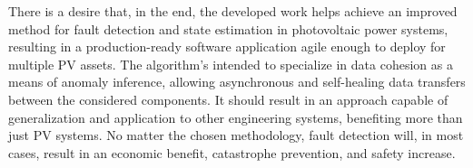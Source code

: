 There is a desire that, in the end, the developed work helps achieve an improved method for fault detection and state estimation in photovoltaic power systems, resulting in a production-ready software application agile enough to deploy for multiple PV assets. The algorithm's intended to specialize in data cohesion as a means of anomaly inference, allowing asynchronous and self-healing data transfers between the considered components. It should result in an approach capable of generalization and application to other engineering systems, benefiting more than just PV systems. No matter the chosen methodology, fault detection will, in most cases, result in an economic benefit, catastrophe prevention, and safety increase.